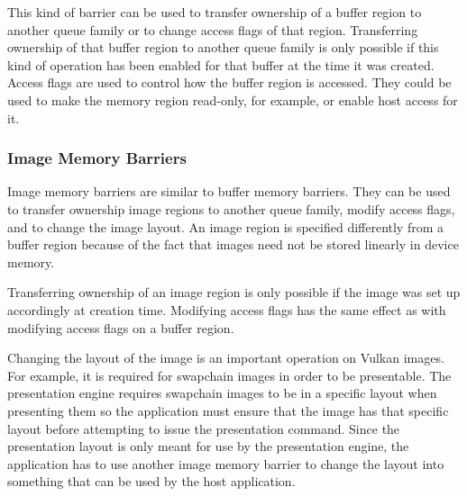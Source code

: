         This kind of barrier can be used to transfer ownership of a buffer region to another queue family or to change access flags of that region. Transferring ownership of that buffer region to another queue family is only possible if this kind of operation has been enabled for that buffer at the time it was created. Access flags are used to control how the buffer region is accessed. They could be used to make the memory region read-only, for example, or enable \gls{host} access for it.

      \subsubsection{Image Memory Barriers}
        Image memory barriers are similar to buffer memory barriers. They can be used to transfer ownership image regions to another queue family, modify access flags, and to change the image layout. An image region is specified differently from a buffer region because of the fact that images need not be stored linearly in \gls{device} memory.

        Transferring ownership of an image region is only possible if the image was set up accordingly at creation time. Modifying access flags has the same effect as with modifying access flags on a buffer region.

        Changing the layout of the image is an important operation on Vulkan images. For example, it is required for swapchain images in order to be presentable. The presentation engine requires swapchain images to be in a specific layout when presenting them so the \gls{application} must ensure that the image has that specific layout before attempting to issue the presentation command. Since the presentation layout is only meant for use by the presentation engine, the \gls{application} has to use another image memory barrier to change the layout into something that can be used by the \gls{host} \gls{application}.
